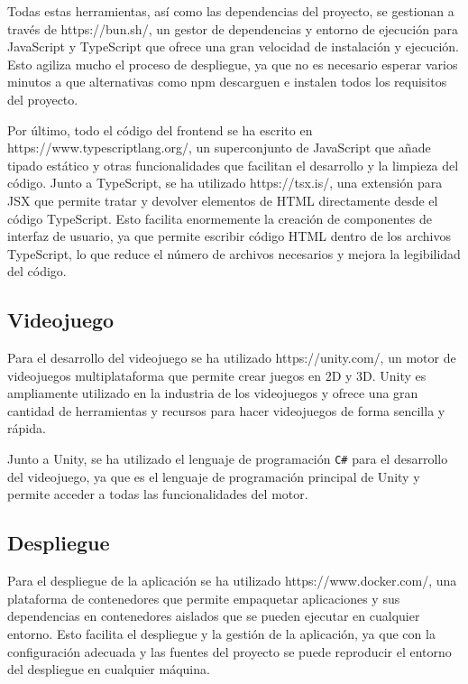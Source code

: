 Todas estas herramientas, así como las dependencias del proyecto, se gestionan a
través de  {https://bun.sh/}, un gestor de dependencias y entorno de
ejecución para JavaScript y TypeScript que ofrece una gran velocidad de
instalación y ejecución. Esto agiliza mucho el proceso de despliegue, ya que no
es necesario esperar varios minutos a que alternativas como npm descarguen e
instalen todos los requisitos del proyecto.

Por último, todo el código del \gls{frontend} se ha escrito en 
{https://www.typescriptlang.org/}, un superconjunto de JavaScript que añade
tipado estático y otras funcionalidades que facilitan el desarrollo y la
limpieza del código. Junto a TypeScript, se ha utilizado 
{https://tsx.is/}, una extensión para JSX que permite tratar y devolver
elementos de HTML directamente desde el código TypeScript. Esto facilita
enormemente la creación de componentes de interfaz de usuario, ya que permite
escribir código HTML dentro de los archivos TypeScript, lo que reduce el número
de archivos necesarios y mejora la legibilidad del código.

\subsection{Videojuego}
\label{sec:videojuego}
Para el desarrollo del videojuego se ha utilizado 
{https://unity.com/}, un motor de videojuegos multiplataforma que permite crear
juegos en 2D y 3D.  Unity es ampliamente utilizado en la industria de los
videojuegos y ofrece una gran cantidad de herramientas y recursos para hacer
videojuegos de forma sencilla y rápida.

Junto a Unity, se ha utilizado el lenguaje de programación \texttt{C\#} para el
desarrollo del videojuego, ya que es el lenguaje de programación principal de
Unity y permite acceder a todas las funcionalidades del motor.

\subsection{Despliegue}
\label{sec:despliegue}
Para el despliegue de la aplicación se ha utilizado 
{https://www.docker.com/}, una plataforma de contenedores que permite empaquetar
aplicaciones y sus dependencias en contenedores aislados que se pueden ejecutar
en cualquier entorno. Esto facilita el despliegue y la gestión de la aplicación,
ya que con la configuración adecuada y las fuentes del proyecto se puede
reproducir el entorno del despliegue en cualquier máquina.

